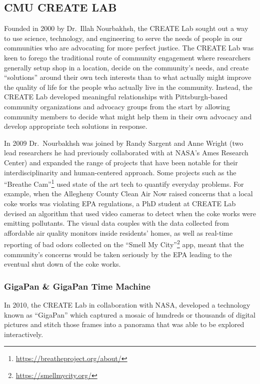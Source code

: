 \documentclass[
  12pt,
]{krantz}
\renewcommand{\href}[2]{#2\footnote{\url{#1}}}
\begin{document}
\hypertarget{cmu-create-lab}{%
\subsection{CMU CREATE LAB}\label{cmu-create-lab}}

Founded in 2000 by Dr.~Illah Nourbakhsh, the CREATE Lab sought out a way to use science, technology, and engineering to serve the needs of people in our communities who are advocating for more perfect justice. The CREATE Lab was keen to forego the traditional route of community engagement where researchers generally setup shop in a location, decide on the community's needs, and create ``solutions'' around their own tech interests than to what actually might improve the quality of life for the people who actually live in the community. Instead, the CREATE Lab developed meaningful relationships with Pittsburgh-based community organizations and advocacy groups from the start by allowing community members to decide what might help them in their own advocacy and develop appropriate tech solutions in response.

In 2009 Dr.~Nourbakhsh was joined by Randy Sargent and Anne Wright (two lead researchers he had previously collaborated with at NASA's Ames Research Center) and expanded the range of projects that have been notable for their interdisciplinarity and human-centered approach. Some projects such as the \href{https://breatheproject.org/about/}{``Breathe Cam''} used state of the art tech to quantify everyday problems. For example, when the Allegheny County Clean Air Now raised concerns that a local coke works was violating EPA regulations, a PhD student at CREATE Lab devised an algorithm that used video cameras to detect when the coke works were emitting pollutants. The visual data couples with the data collected from affordable air quality monitors inside residents' homes, as well as real-time reporting of bad odors collected on the \href{https://smellmycity.org/}{``Smell My City''} app, meant that the community's concerns would be taken seriously by the EPA leading to the eventual shut down of the coke works.

\hypertarget{gigapan-gigapan-time-machine}{%
\subsubsection*{GigaPan \& GigaPan Time Machine}\label{gigapan-gigapan-time-machine}}


In 2010, the CREATE Lab in collaboration with NASA, developed a technology known as ``GigaPan'' which captured a mosaic of hundreds or thousands of digital pictures and stitch those frames into a panorama that was able to be explored interactively.
\end{document}
